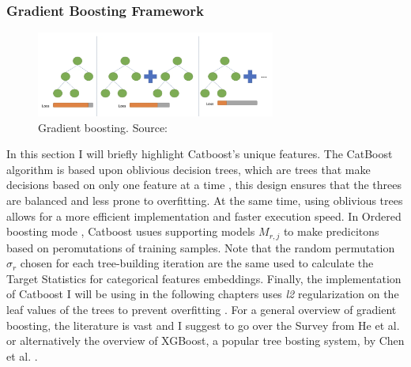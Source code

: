 \subsubsection{Gradient Boosting Framework}

\begin{figure}[H]
    \centering
    \includegraphics[width=0.7\textwidth]{figures/gradient_boosting_v2.png}
    \caption{Gradient boosting. Source: \cite{Yenigun2022}}
    \label{fig:catboost}
\end{figure}

In this section I will briefly highlight Catboost's unique features. The CatBoost algorithm is based upon oblivious decision trees, which are trees that make decisions based on only one feature at a time \cite{dorogush2018catboost}, this design ensures that the threes are balanced and less prone to overfitting. At the same time, using oblivious trees allows for a more efficient implementation and faster execution speed. In Ordered boosting mode \cite{dorogush2018catboost}, Catboost usues supporting models $M_{r,j}$ to make predicitons based on peromutations of training samples. Note that the random permutation $\sigma_r$ chosen for each tree-building iteration are the same used to calculate the Target Statistics for categorical features embeddings. Finally, the implementation of Catboost I will be using in the following chapters uses \textit{l2} regularization on the leaf values of the trees to prevent overfitting \cite{dorogush2018catboost,prokhorenkova2018catboost}. For a general overview of gradient boosting, the literature is vast and I suggest to go over the Survey from He et al. \cite{he2019gradient} or alternatively the overview of XGBoost, a popular tree bosting system, by Chen et al. \cite{Chen_2016}. 







